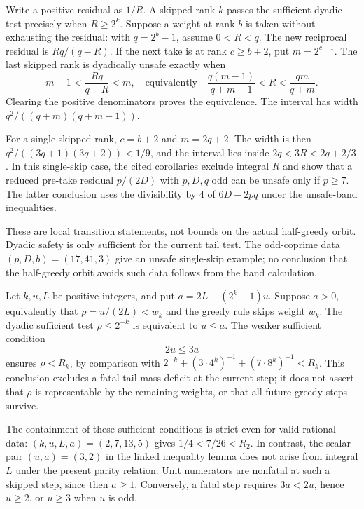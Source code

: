 \begin{thm}
\label{thm:two-thirds-band}
Write a positive residual as $1/R$.  A skipped rank $k$ passes
the sufficient dyadic test precisely when $R\ge2^k$.
Suppose a weight at rank $b$ is taken without exhausting the
residual: with $q=2^b-1$, assume $0<R<q$.
The new reciprocal residual is $Rq/(q-R)$.
If the next take is at rank $c\ge b+2$, put $m=2^{c-1}$.
The last skipped rank is dyadically unsafe exactly when
\[
 m-1<\frac{Rq}{q-R}<m,
 \quad\text{equivalently}\quad
 \frac{q(m-1)}{q+m-1}<R<\frac{qm}{q+m}.
\]
Clearing the positive denominators proves the equivalence.
The interval has width $q^2/((q+m)(q+m-1))$.

For a single skipped rank, $c=b+2$ and $m=2q+2$.
The width is then $q^2/((3q+1)(3q+2))<1/9$, and the
interval lies inside $2q<3R<2q+2/3$.
In this single-skip case, the cited corollaries exclude integral
$R$ and show that a reduced pre-take residual $p/(2D)$ with
$p,D,q$ odd can be unsafe only if $p\ge7$.
The latter conclusion uses the divisibility by $4$ of
$6D-2pq$ under the unsafe-band inequalities.

These are local transition statements, not bounds on the actual
half-greedy orbit.  Dyadic safety is only sufficient for the
current tail test.  The odd-coprime data $(p,D,b)=(17,41,3)$
give an unsafe single-skip example; no conclusion that the
half-greedy orbit avoids such data follows from the band calculation.
\end{thm}

\begin{thm}
\label{thm:sharp-fatal-gap}
Let $k,u,L$ be positive integers, and put
$a=2L-(2^k-1)u$.  Suppose $a>0$, equivalently that
$\rho=u/(2L)<w_k$ and the greedy rule skips weight $w_k$.
The dyadic sufficient test $\rho\le2^{-k}$ is equivalent to $u\le a$.
The weaker sufficient condition
\[
 2u\le3a
\]
ensures $\rho<R_k$, by comparison with
$2^{-k}+(3\cdot4^k)^{-1}+(7\cdot8^k)^{-1}<R_k$.
This conclusion excludes a fatal tail-mass deficit at the current step;
it does not assert that $\rho$ is representable by the remaining
weights, or that all future greedy steps survive.

The containment of these sufficient conditions is strict even for
valid rational data: $(k,u,L,a)=(2,7,13,5)$ gives
$1/4<7/26<R_2$.  In contrast, the scalar pair $(u,a)=(3,2)$ in the
linked inequality lemma does not arise from integral $L$ under the
present parity relation.  Unit numerators are nonfatal at such a
skipped step, since then $a\ge1$.  Conversely, a fatal step requires
$3a<2u$, hence $u\ge2$, or $u\ge3$ when $u$ is odd.
\end{thm}

